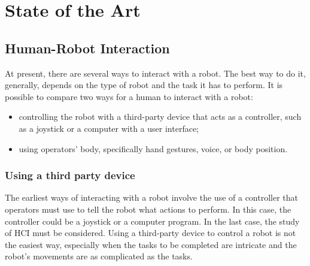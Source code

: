 \documentclass[../thesis.tex]{subfiles}
\begin{document}
\chapter{State of the Art}\label{cap:theory}

\section{Human-Robot Interaction}
At present, there are several ways to interact with a robot. The best way to do it, generally, depends on the type of robot and the task it has to perform. It is possible to compare two ways for a human to interact with a robot:
\begin{itemize}
    \item controlling the robot with a third-party device that acts as a controller, such as a joystick or a computer with a user interface;
    \item using operators' body, specifically hand gestures, voice, or body position.
\end{itemize}
\subsection{Using a third party device}
The earliest ways of interacting with a robot involve the use of a controller that operators must use to tell the robot what actions to perform. In this case, the controller could be a joystick or a computer program. In the last case, the study of \acrfull{HCI} must be considered. Using a third-party device to control a robot is not the easiest way, especially when the tasks to be completed are intricate and the robot’s movements are as complicated as the tasks.
\end{document}
